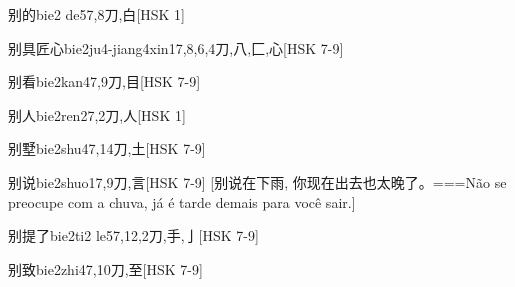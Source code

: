 \begin{EntryWithPhonetic}{别的}{bie2 de5}{7,8}{⼑,⽩}[HSK 1]
\end{EntryWithPhonetic}

\begin{EntryWithPhonetic}{别具匠心}{bie2ju4-jiang4xin1}{7,8,6,4}{⼑,⼋,⼕,⼼}[HSK 7-9]
\end{EntryWithPhonetic}

\begin{EntryWithPhonetic}{别看}{bie2kan4}{7,9}{⼑,⽬}[HSK 7-9]
\end{EntryWithPhonetic}

\begin{EntryWithPhonetic}{别人}{bie2ren2}{7,2}{⼑,⼈}[HSK 1]
\end{EntryWithPhonetic}

\begin{EntryWithPhonetic}{别墅}{bie2shu4}{7,14}{⼑,⼟}[HSK 7-9]
\end{EntryWithPhonetic}

\begin{EntryWithPhonetic}{别说}{bie2shuo1}{7,9}{⼑,⾔}[HSK 7-9]
  [别说在下雨, 你现在出去也太晚了。===Não se preocupe com a chuva, já é tarde demais para você sair.]
\end{EntryWithPhonetic}

\begin{EntryWithPhonetic}{别提了}{bie2ti2 le5}{7,12,2}{⼑,⼿,⼅}[HSK 7-9]
\end{EntryWithPhonetic}

\begin{EntryWithPhonetic}{别致}{bie2zhi4}{7,10}{⼑,⾄}[HSK 7-9]
\end{EntryWithPhonetic}

